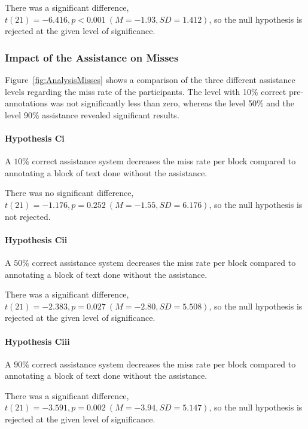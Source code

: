 		There was a significant difference, \(t(21) = -6.416, p < 0.001\ (M = -1.93, SD = 1.412)\), so the null hypothesis is rejected at the given level of significance.



	\subsubsection{Impact of the Assistance on Misses}
		Figure~\ref{fig:AnalysisMisses} shows a comparison of the three different assistance levels regarding the miss rate of the participants. The level with 10\% correct pre-annotations was not significantly less than zero, whereas the level 50\% and the level 90\% assistance revealed significant results.


		\paragraph{Hypothesis Ci}
		\lqq A \(10\%\) correct assistance system decreases the miss rate per block compared to annotating a block of text done without the assistance.\rqq

		There was no significant difference, \(t(21) = -1.176, p = 0.252\ (M = -1.55, SD = 6.176)\), so the null hypothesis is not rejected.

		\paragraph{Hypothesis Cii}
		\lqq A \(50\%\) correct assistance system decreases the miss rate per block compared to annotating a block of text done without the assistance.\rqq

		There was a significant difference, \(t(21) = -2.383, p = 0.027\ (M = -2.80, SD = 5.508)\), so the null hypothesis is rejected at the given level of significance.

		\paragraph{Hypothesis Ciii}
		\lqq A \(90\%\) correct assistance system decreases the miss rate per block compared to annotating a block of text done without the assistance.\rqq

		There was a significant difference, \(t(21) = -3.591, p = 0.002\ (M = -3.94, SD = 5.147)\), so the null hypothesis is rejected at the given level of significance.
